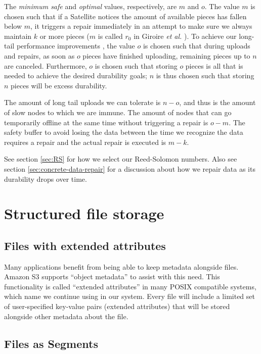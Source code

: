 \documentclass[8pt,fleqn,openany]{book}
\begin{document}
The {\em minimum safe} and {\em optimal} values, respectively, are $m$ and $o$. The
value $m$ is chosen such that if a Satellite notices the amount of available pieces
has fallen below $m$, it triggers a repair
immediately in an attempt to make sure we always maintain
$k$ or more pieces ($m$ is called $r_0$ in Giroire {\em et al.} \cite{p2p-lazy}).
To achieve our long-tail performance improvements
\cite{rs-stragglers, tail-at-scale, mapreduce, rs-intro},
the value $o$ is chosen such that during uploads and repairs,
as soon as $o$ pieces have finished uploading, remaining pieces up to $n$ are
canceled.
Furthermore, $o$ is chosen such that storing $o$ pieces is all that is
needed to achieve the desired durability goals; $n$ is thus chosen such that
storing $n$ pieces will be excess durability.

The amount of long tail uploads we can tolerate is $n-o$, and thus is the amount
of slow nodes to which we are immune.  The amount of nodes that can go
temporarily offline at the same time without triggering a repair is $o-m$. The
safety buffer to avoid losing the data between the time we recognize the data
requires a repair and the actual repair is executed is $m-k$.

See section \ref{sec:RS} for how we select our Reed-Solomon numbers.
Also see section \ref{sec:concrete-data-repair} for a discussion about
how we repair data as its durability drops over time.

\section{Structured file storage}\label{sec:structured-file-storage}

\subsection{Files with extended attributes}

Many applications benefit from being able to keep metadata alongside files.
Amazon S3 supports ``object metadata'' \cite{s3-object-meta} to assist with this
need. This functionality is called ``extended attributes'' in many POSIX
compatible systems, which name we continue using in our system.
Every file will include a limited set of user-specified key-value pairs
(extended attributes) that will be stored alongside other metadata about the
file.

\subsection{Files as Segments}\label{files-as-segments}
\end{document}
